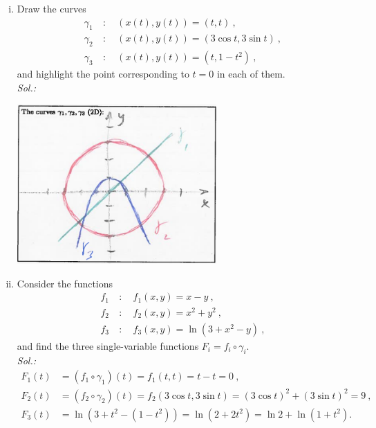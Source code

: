 \begin{example}
\label{expl:chainruleI}
\begin{enumerate}[(i)]
	\item Draw the curves
		\begin{equation*}
		\begin{split}
		\gamma_1 \: & : \quad (x(t),y(t)) = (t,t) \:, \\
		\gamma_2 \: & : \quad (x(t),y(t)) = (3\cos t,3\sin t) \:, \\
		\gamma_3 \: & : \quad (x(t),y(t)) = (t,1-t^2) \:, 
		\end{split}
		\end{equation*}
		and highlight the point corresponding to $t=0$ in each of them. \\
		{\it Sol.:} 
		\begin{center}
			\includegraphics[width=0.6\textwidth]{./Figures/f305.png}
		\end{center}
	\item Consider the functions
		\begin{equation*}
		\begin{split}
		f_1 \: & : \quad f_1(x,y) = x-y \:, \\
		f_2 \: & : \quad f_2(x,y) = x^2+y^2 \:, \\
		f_3 \: & : \quad f_3(x,y) = \ln (3+x^2-y) \:, 
		\end{split}
		\end{equation*}
		and find the three single-variable functions $F_i=f_i\circ\gamma_i$.\\
		{\it Sol.:} 
		\begin{equation}
		\label{eq:chainruleI}
		\begin{split}
		F_1(t) & = \left(f_1\circ\gamma_1\right)(t) = f_1(t,t) = t-t = 0 \:, \\
		F_2(t) & = \left(f_2\circ\gamma_2\right)(t) = f_2(3\cos t, 3\sin t) 
		= (3\cos t)^2 +  (3\sin t)^2 = 9 \:, \\
		F_3(t) & = \ln \left( 3 + t^2 - (1-t^2) \right) = \ln \left( 2 + 2t^2\right) = \ln 2 + \ln\left(1+t^2\right).
		\end{split}
		\end{equation}
\end{enumerate}
\end{example}

